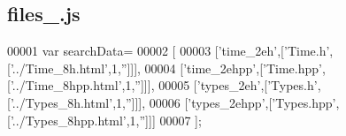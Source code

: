 \subsection{files\+\_.\+js}
\label{files__7_8js_source}

\begin{DoxyCode}
00001 var searchData=
00002 [
00003   [\textcolor{stringliteral}{'time\_2eh'},[\textcolor{stringliteral}{'Time.h'},[\textcolor{stringliteral}{'../Time\_8h.html'},1,\textcolor{stringliteral}{''}]]],
00004   [\textcolor{stringliteral}{'time\_2ehpp'},[\textcolor{stringliteral}{'Time.hpp'},[\textcolor{stringliteral}{'../Time\_8hpp.html'},1,\textcolor{stringliteral}{''}]]],
00005   [\textcolor{stringliteral}{'types\_2eh'},[\textcolor{stringliteral}{'Types.h'},[\textcolor{stringliteral}{'../Types\_8h.html'},1,\textcolor{stringliteral}{''}]]],
00006   [\textcolor{stringliteral}{'types\_2ehpp'},[\textcolor{stringliteral}{'Types.hpp'},[\textcolor{stringliteral}{'../Types\_8hpp.html'},1,\textcolor{stringliteral}{''}]]]
00007 ];
\end{DoxyCode}

